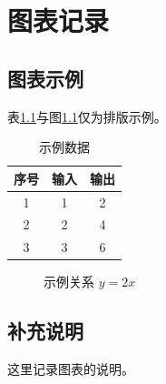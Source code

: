 \chapter{图表记录}
\label{chap:chapter6}

\section{图表示例}
表\ref{tab:example}与图\ref{fig:example}仅为排版示例。
\begin{table}[htbp]
  \centering
  \caption{示例数据}\label{tab:example}
  \begin{tabular}{ccc}
    \toprule
    序号 & 输入 & 输出 \\
    \midrule
    1 & 1 & 2 \\
    2 & 2 & 4 \\
    3 & 3 & 6 \\
    \bottomrule
  \end{tabular}
\end{table}

\begin{figure}[htbp]
  \centering
  \caption{示例关系 \(y=2x\)}\label{fig:example}
\end{figure}

\section{补充说明}
这里记录图表的说明。
